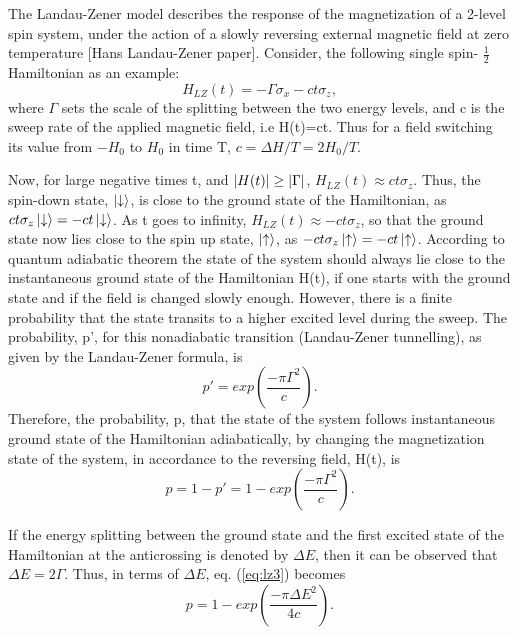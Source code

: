 \documentclass[../main.tex]{subfiles}
\begin{document}
The Landau-Zener model describes the response of the magnetization of a 2-level spin system, under the action of a slowly reversing external magnetic field at zero temperature [Hans Landau-Zener paper]. Consider, the following single spin- $\frac{1}{2}$ Hamiltonian as an example:
\begin{equation}
H_{LZ}(t)=-\Gamma \sigma_x -c t \sigma_z, \label{eq:lz1}
\end{equation}
where $\Gamma$ sets the scale of the splitting between the two energy levels, and c is the sweep rate of the applied magnetic field, i.e H(t)=ct. Thus for a field switching its value from $-H_0$ to $H_0$ in time T, $c=\Delta H/T= 2H_0/T$.

Now, for large negative times t, and $\abs{H(t)} \geq \abs{\Gamma}$, $H_{LZ}(t)\approx ct \sigma_z$. Thus, the spin-down state, $\ket{\downarrow}$, is close to the ground state of the Hamiltonian, as $ct \sigma_z \ket{\downarrow}=-ct \ket{\downarrow}$. As t goes to infinity, $H_{LZ}(t)\approx -ct \sigma_z$, so that the ground state now lies close to the spin up state, $\ket{\uparrow}$, as $-ct \sigma_z \ket{\uparrow}=-ct \ket{\uparrow}$. According to quantum adiabatic theorem the state of the system should always lie close to the instantaneous ground state of the Hamiltonian H(t), if one starts with the ground state and if the field is changed slowly enough. However, there is a finite probability that the state transits to a higher excited level during the sweep. The probability, p', for this nonadiabatic transition (Landau-Zener tunnelling), as given by the Landau-Zener formula, is
\begin{equation}
p'=exp(\frac{-\pi {\Gamma}^2}{c}) . 
\end{equation}
Therefore, the probability, p, that the state of the system follows instantaneous ground state of the Hamiltonian adiabatically, by changing the magnetization state of the system, in accordance to the reversing field, H(t), is
\begin{equation}
p=1-p'=1-exp(\frac{-\pi {\Gamma}^2}{c}) .   \label{eq:lz2}
\end{equation}

If the energy splitting between the ground state and the first excited state of the Hamiltonian at the anticrossing is denoted by $\Delta E$, then it can be observed that $\Delta E= 2 \Gamma$. Thus, in terms of $\Delta E$, eq. (\ref{eq:lz3}) becomes 
\begin{equation}
p=1-exp(\frac{-\pi {\Delta E}^2}{4c}) .   \label{eq:lz3}
\end{equation}
\end{document}
